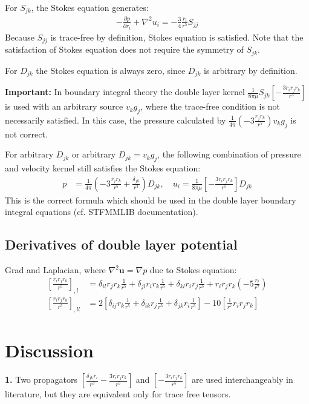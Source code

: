 \documentclass[11pt]{article}
\newcommand{\dpone}[2]{\ensuremath{\displaystyle\frac{\partial {#1}}{\partial {#2}}}}
\newcommand{\bu}{\ensuremath{\bm{u}}}
\begin{document}
For $S_{jk}$, the Stokes equation generates:
\begin{align}
	-\dpone{p}{r_i} + \nabla^2 u_i = -\frac{3}{4}\frac{r_i}{r^5} S_{jj}
\end{align}
Because $S_{jj}$ is trace-free by definition, Stokes equation is satisfied. Note that the satisfaction of Stokes equation does not require the symmetry of $S_{jk}$.

For $D_{jk}$ the Stokes equation is always zero, since $D_{jk}$ is arbitrary by definition.

\textbf{Important: }In boundary integral theory the double layer kernel $\frac{1}{8\pi\mu}S_{jk}\left[ - \frac{3r_ir_jr_k}{r^5} \right]$ is used with an arbitrary source $v_kg_j$, where the trace-free condition is not necessarily satisfied. In this case, the pressure calculated by $\frac{1}{4\pi}\left(-3\frac{r_jr_k}{r^5}\right)v_kg_j$ is not correct.

For arbitrary $D_{jk}$ or arbitrary $D_{jk}=v_kg_j$, the following combination of pressure and velocity kernel still satisfies the Stokes equation:
\begin{align}\label{eq:doublelayerfmm}
		p& =\frac{1}{4\pi}\left(-3\frac{r_jr_k}{r^5} + \frac{\delta_{jk}}{r^3}\right)D_{jk}, \quad u_i = \frac{1}{8\pi\mu}\left[ - \frac{3r_ir_jr_k}{r^5} \right] D_{jk}
\end{align}
This is the correct formula which should be used in the double layer boundary integral equations (cf. STFMMLIB documentation).


\subsection{Derivatives of double layer potential}
Grad and Laplacian, where $\nabla^2 \bu = \nabla p$ due to Stokes equation:
\begin{align}
	\left[\frac{r_ir_jr_k}{r^5} \right]_{,l} &= \delta_{il}r_jr_k\frac{1}{r^5} + \delta_{jl}r_ir_k\frac{1}{r^5} + \delta_{kl}r_ir_j\frac{1}{r^5} + r_ir_jr_k\left(-5\frac{r_l}{r^7}\right) \\
	\left[\frac{r_ir_jr_k}{r^5} \right]_{,ll} &= 2\left[\delta_{ij}r_k\frac{1}{r^5}+\delta_{ik}r_j\frac{1}{r^5}+\delta_{jk}r_i\frac{1}{r^5}\right]-10\left[\frac{1}{r^7}r_ir_jr_k\right]
\end{align}



\section{Discussion}
\textbf{1. } Two propagators $\left[ \frac{\delta_{jk}r_i}{r^3} - \frac{3r_ir_jr_k}{r^5} \right]$ and $\left[ - \frac{3r_ir_jr_k}{r^5} \right]$ are used interchangeably in literature, but they are equivalent only for trace free tensors.
\end{document}
